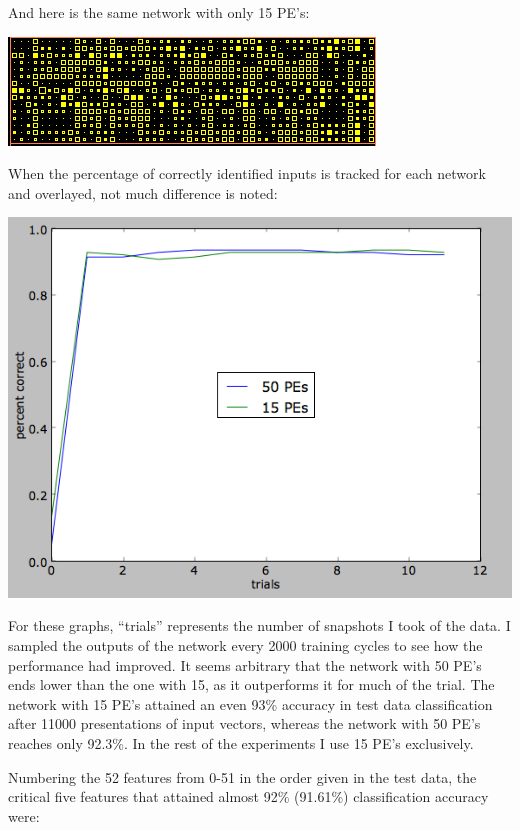 \documentclass[12pt]{article}
\begin{document}
And here is the same network with only 15 PE's:

\begin{center}
\includegraphics[scale=0.9]{52f15kweights.png}
\end{center}

When the percentage of correctly identified inputs is tracked for each network and overlayed, not much difference is noted:

\begin{center}
\includegraphics[scale=0.55]{52features.png}
\end{center}

For these graphs, ``trials'' represents the number of snapshots I took of the data.  I sampled the outputs of the network every 2000 training cycles to see how the performance had improved.  It seems arbitrary that the network with 50 PE's ends lower than the one with 15, as it outperforms it for much of the trial.  The network with 15 PE's attained an even 93\% accuracy in test data classification after 11000 presentations of input vectors, whereas the network with 50 PE's reaches only 92.3\%.  In the rest of the experiments I use 15 PE's exclusively.

Numbering the 52 features from 0-51 in the order given in the test data, the critical five features that attained almost 92\% (91.61\%) classification accuracy were:
\end{document}
